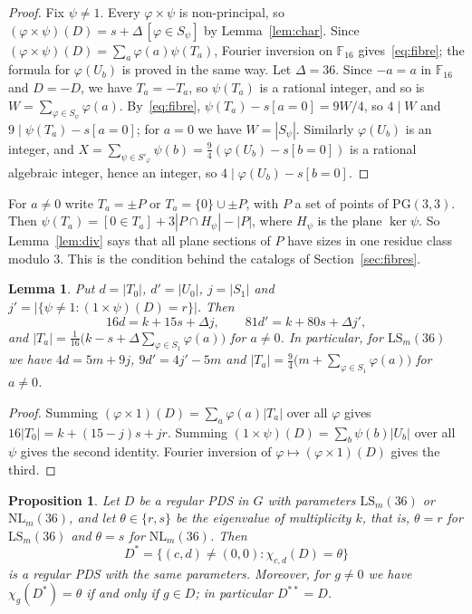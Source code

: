\documentclass[11pt]{amsart}
\newtheorem{lemma}[theorem]{Lemma}
\newtheorem{proposition}[theorem]{Proposition}
\theoremstyle{definition}
\newcommand{\F}{\mathbb{F}}
\newcommand{\LS}{\mathrm{LS}}
\newcommand{\NL}{\mathrm{NL}}
\begin{document}
\begin{proof}
Fix $\psi\ne1$. Every $\varphi\times\psi$ is non-principal, so $(\varphi\times\psi)(D)=s+\Delta\,[\varphi\in S_\psi]$ by Lemma~\ref{lem:char}. Since $(\varphi\times\psi)(D)=\sum_a\varphi(a)\psi(T_a)$, Fourier inversion on $\F_{16}$ gives~\eqref{eq:fibre}; the formula for $\varphi(U_b)$ is proved in the same way. Let $\Delta=36$. Since $-a=a$ in $\F_{16}$ and $D=-D$, we have $T_a=-T_a$, so $\psi(T_a)$ is a rational integer, and so is $W=\sum_{\varphi\in S_\psi}\varphi(a)$. By~\eqref{eq:fibre}, $\psi(T_a)-s[a=0]=9W/4$, so $4\mid W$ and $9\mid\psi(T_a)-s[a=0]$; for $a=0$ we have $W=|S_\psi|$. Similarly $\varphi(U_b)$ is an integer, and $X=\sum_{\psi\in S'_\varphi}\psi(b)=\frac94(\varphi(U_b)-s[b=0])$ is a rational algebraic integer, hence an integer, so $4\mid\varphi(U_b)-s[b=0]$.
\end{proof}

For $a\ne0$ write $T_a=\pm P$ or $T_a=\{0\}\cup\pm P$, with $P$ a set of points of $\mathrm{PG}(3,3)$. Then $\psi(T_a)=[0\in T_a]+3|P\cap H_\psi|-|P|$, where $H_\psi$ is the plane $\ker\psi$. So Lemma~\ref{lem:div} says that all plane sections of $P$ have sizes in one residue class modulo $3$. This is the condition behind the catalogs of Section~\ref{sec:fibres}.

\begin{lemma}\label{lem:trace}
Put $d=|T_0|$, $d'=|U_0|$, $j=|S_1|$ and $j'=|\{\psi\ne1:(1\times\psi)(D)=r\}|$. Then
\[
16d=k+15s+\Delta j,\qquad 81d'=k+80s+\Delta j',
\]
and $|T_a|=\frac{1}{16}\bigl(k-s+\Delta\sum_{\varphi\in S_1}\varphi(a)\bigr)$ for $a\ne0$. In particular, for $\LS_m(36)$ we have $4d=5m+9j$, $9d'=4j'-5m$ and $|T_a|=\frac94\bigl(m+\sum_{\varphi\in S_1}\varphi(a)\bigr)$ for $a\ne0$.
\end{lemma}

\begin{proof}
Summing $(\varphi\times1)(D)=\sum_a\varphi(a)|T_a|$ over all $\varphi$ gives $16|T_0|=k+(15-j)s+jr$. Summing $(1\times\psi)(D)=\sum_b\psi(b)|U_b|$ over all $\psi$ gives the second identity. Fourier inversion of $\varphi\mapsto(\varphi\times1)(D)$ gives the third.
\end{proof}


\begin{proposition}\label{prop:dual}
Let $D$ be a regular PDS in $G$ with parameters $\LS_m(36)$ or $\NL_m(36)$, and let $\theta\in\{r,s\}$ be the eigenvalue of multiplicity $k$, that is, $\theta=r$ for $\LS_m(36)$ and $\theta=s$ for $\NL_m(36)$. Then
\[
D^*=\{(c,d)\ne(0,0):\chi_{c,d}(D)=\theta\}
\]
is a regular PDS with the same parameters. Moreover, for $g\ne0$ we have $\chi_g(D^*)=\theta$ if and only if $g\in D$; in particular $D^{**}=D$.
\end{proposition}
\end{document}
